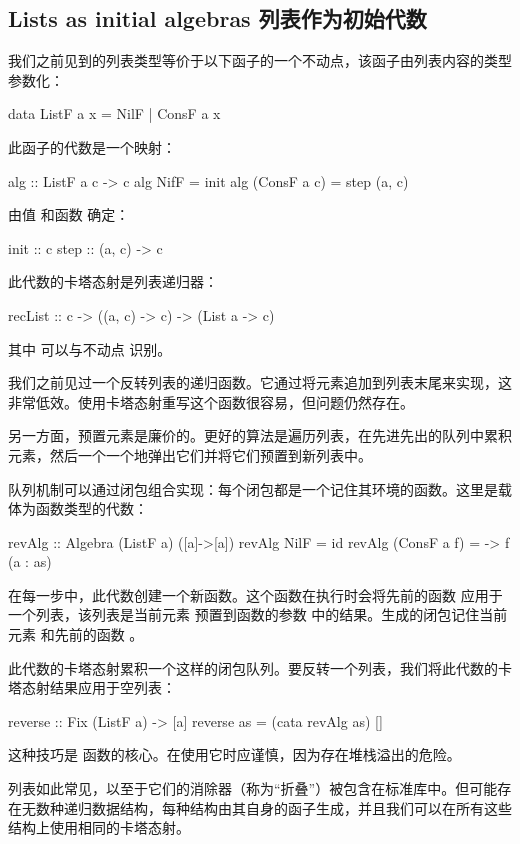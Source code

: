 \documentclass[DaoFP]{subfiles}
\begin{document}
 \subsection{Lists as initial algebras 列表作为初始代数}

 我们之前见到的列表类型等价于以下函子的一个不动点，该函子由列表内容的类型  参数化：
 \begin{haskell}
  data ListF a x = NilF | ConsF a x
 \end{haskell}
 此函子的代数是一个映射：
 \begin{haskell}
  alg :: ListF a c -> c
  alg NifF = init
  alg (ConsF a c) = step (a, c)
 \end{haskell}
 由值  和函数  确定：
 \begin{haskell}
  init :: c
  step :: (a, c) -> c
 \end{haskell}
 此代数的卡塔态射是列表递归器：
 \begin{haskell}
  recList :: c -> ((a, c) -> c) -> (List a -> c)
 \end{haskell}
 其中  可以与不动点  识别。

 我们之前见过一个反转列表的递归函数。它通过将元素追加到列表末尾来实现，这非常低效。使用卡塔态射重写这个函数很容易，但问题仍然存在。

 另一方面，预置元素是廉价的。更好的算法是遍历列表，在先进先出的队列中累积元素，然后一个一个地弹出它们并将它们预置到新列表中。

 队列机制可以通过闭包组合实现：每个闭包都是一个记住其环境的函数。这里是载体为函数类型的代数：
 \begin{haskell}
  revAlg :: Algebra (ListF a) ([a]->[a])
  revAlg NilF = id
  revAlg (ConsF a f) = \as -> f (a : as)
 \end{haskell}
 在每一步中，此代数创建一个新函数。这个函数在执行时会将先前的函数  应用于一个列表，该列表是当前元素  预置到函数的参数  中的结果。生成的闭包记住当前元素  和先前的函数 。

 此代数的卡塔态射累积一个这样的闭包队列。要反转一个列表，我们将此代数的卡塔态射结果应用于空列表：
 \begin{haskell}
  reverse :: Fix (ListF a) -> [a]
  reverse as = (cata revAlg as) []
 \end{haskell}
 这种技巧是  函数的核心。在使用它时应谨慎，因为存在堆栈溢出的危险。

 列表如此常见，以至于它们的消除器（称为“折叠”）被包含在标准库中。但可能存在无数种递归数据结构，每种结构由其自身的函子生成，并且我们可以在所有这些结构上使用相同的卡塔态射。
\end{document}

